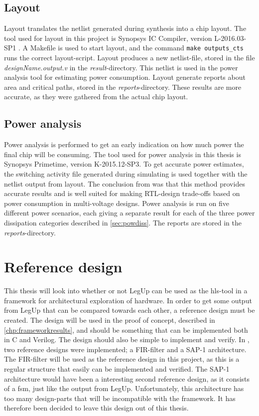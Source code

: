 \subsection{Layout}
Layout translates the netlist generated during synthesis into a chip layout. The tool used for layout in this project is Synopsys IC Compiler, version L-2016.03-SP1 \cite{syniccomp}. A Makefile is used to start layout, and the command \verb!make outputs_cts! runs the correct layout-script. Layout produces a new netlist-file, stored in the file \textit{designName.output.v} in the \textit{result}-directory. This netlist is used in the power analysis tool for estimating power consumption. Layout generate reports about area and critical paths, stored in the \textit{reports}-directory. These results are more accurate, as they were gathered from the actual chip layout.
\subsection{\label{sec:powest}Power analysis}
Power analysis is performed to get an early indication on how much power the final chip will be consuming. The tool used for power analysis in this thesis is Synopsys Primetime, version K-2015.12-SP3. To get accurate power estimates, the switching activity file generated during simulating is used together with the netlist output from layout. The conclusion from \cite{talstad15master} was that this method provides accurate results and is well suited for making RTL-design trade-offs based on power consumption in multi-voltage designs. Power analysis is run on five different power scenarios, each giving a separate result for each of the three power dissipation categories described in \cref{sec:powdiss}. The reports are stored in the \textit{reports}-directory.

\section{Reference design}
\label{sec:refdes}
This thesis will look into whether or not LegUp can be used as the \gls{hls}-tool in a framework for architectural exploration of hardware. In order to get some output from LegUp that can be compared towards each other, a reference design must be created. The design will be used in the proof of concept, described in \cref{chp:frameworkresults}, and should be something that can be implemented both in C and Verilog. The design should also be simple to implement and verify. In \cite{holm2015pro}, two reference designs were implemented; a FIR-filter and a SAP-1 architecture. The FIR-filter will be used as the reference design in this project, as this is a regular structure that easily can be implemented and verified. The SAP-1 architecture would have been a interesting second reference design, as it consists of a \gls{fsm}, just like the output from LegUp. Unfortunately, this architecture has too many design-parts that will be incompatible with the framework. It has therefore been decided to leave this design out of this thesis.

